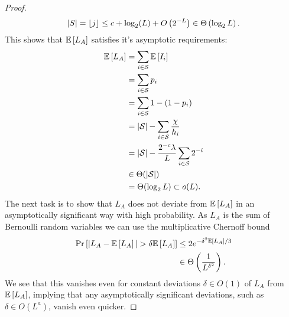 \begin{proof}
$$|S| = \lfloor j \rfloor \leq c + \log_2 (L) + O\left( 2^{-L} \right) \in \Theta \left( \log_2 L \right). $$
This shows that $\mathbb{E}\left[ L_A \right]$ satisfies it's asymptotic requirements:
\begin{align}
    \mathbb{E}\left[ L_A \right] &= \sum_{i \in \mathcal{S}} \mathbb{E}\left[ I_i \right] \\ 
    &= \sum_{i \in \mathcal{S}} p_i \\
    &= \sum_{i \in \mathcal{S}} 1 - (1-p_i) \\
    &= |\mathcal{S}| - \sum_{i \in \mathcal{S}} \frac{\chi}{h_i} \\
    &= |\mathcal{S}| - \frac{2^{-c} \lambda}{L} \sum_{i \in \mathcal{S}} 2^{-i} \\
    &\in \Theta(|\mathcal{S}|) \\
    &= \Theta(\log_2 L) \subset o(L).
\end{align}
The next task is to show that $L_A$ does not deviate from $\mathbb{E}\left[ L_A \right]$ in an asymptotically significant way with high probability. As $L_A$ is the sum of Bernoulli random variables we can use the multiplicative Chernoff bound
\begin{align}
    \text{Pr}\left[ |L_A - \mathbb{E}\left[ L_A \right]| > \delta \mathbb{E}\left[ L_A \right] \right] &\leq 2 e^{- \delta^2 \mathbb{E}\left[ L_A \right] / 3} \\
    & \in \Theta \left( \frac{1}{L^{\delta^2}} \right).
\end{align}
We see that this vanishes even for constant deviations $\delta \in O(1)$ of $L_A$ from $\mathbb{E}\left[ L_A \right]$, implying that any asymptotically significant deviations, such as $\delta \in O(L^a)$, vanish even quicker.
 

\end{proof}
